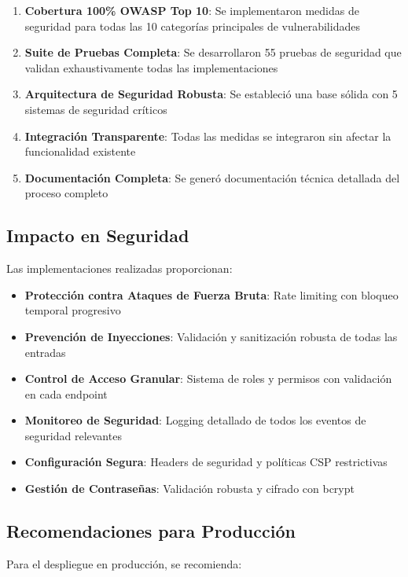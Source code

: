 \documentclass[12pt,a4paper]{article}
\begin{document}
\begin{enumerate}
    \item \textbf{Cobertura 100\% OWASP Top 10}: Se implementaron medidas de seguridad para todas las 10 categorías principales de vulnerabilidades
    \item \textbf{Suite de Pruebas Completa}: Se desarrollaron 55 pruebas de seguridad que validan exhaustivamente todas las implementaciones
    \item \textbf{Arquitectura de Seguridad Robusta}: Se estableció una base sólida con 5 sistemas de seguridad críticos
    \item \textbf{Integración Transparente}: Todas las medidas se integraron sin afectar la funcionalidad existente
    \item \textbf{Documentación Completa}: Se generó documentación técnica detallada del proceso completo
\end{enumerate}

\subsection{Impacto en Seguridad}

Las implementaciones realizadas proporcionan:

\begin{itemize}
    \item \textbf{Protección contra Ataques de Fuerza Bruta}: Rate limiting con bloqueo temporal progresivo
    \item \textbf{Prevención de Inyecciones}: Validación y sanitización robusta de todas las entradas
    \item \textbf{Control de Acceso Granular}: Sistema de roles y permisos con validación en cada endpoint
    \item \textbf{Monitoreo de Seguridad}: Logging detallado de todos los eventos de seguridad relevantes
    \item \textbf{Configuración Segura}: Headers de seguridad y políticas CSP restrictivas
    \item \textbf{Gestión de Contraseñas}: Validación robusta y cifrado con bcrypt
\end{itemize}

\subsection{Recomendaciones para Producción}

Para el despliegue en producción, se recomienda:
\end{document}
